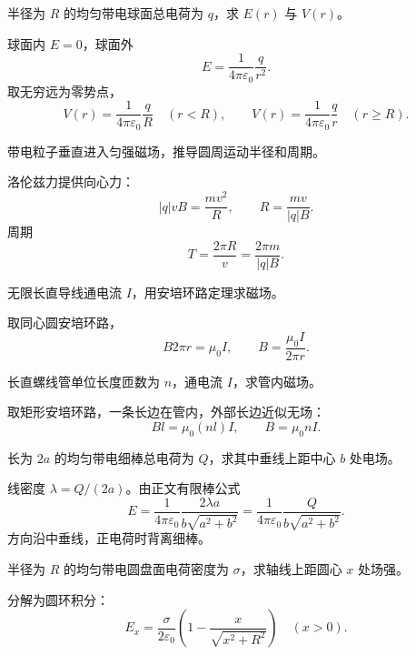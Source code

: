 \begin{exercise}[level=basic]
半径为 $R$ 的均匀带电球面总电荷为 $q$，求 $E(r)$ 与 $V(r)$。
\begin{solution}
球面内 $E=0$，球面外
\[
  E=\frac{1}{4\pi\varepsilon_0}\frac{q}{r^2}.
\]
取无穷远为零势点，
\[
  V(r)=\frac{1}{4\pi\varepsilon_0}\frac{q}{R}\quad(r<R),\qquad
  V(r)=\frac{1}{4\pi\varepsilon_0}\frac{q}{r}\quad(r\ge R).
\]
\end{solution}
\end{exercise}

\begin{exercise}[level=basic]
带电粒子垂直进入匀强磁场，推导圆周运动半径和周期。
\begin{solution}
洛伦兹力提供向心力：
\[
  |q|vB=\frac{mv^2}{R},
  \qquad R=\frac{mv}{|q|B}.
\]
周期
\[
  T=\frac{2\pi R}{v}=\frac{2\pi m}{|q|B}.
\]
\end{solution}
\end{exercise}

\begin{exercise}[level=basic]
无限长直导线通电流 $I$，用安培环路定理求磁场。
\begin{solution}
取同心圆安培环路，
\[
  B2\pi r=\mu_0I,\qquad B=\frac{\mu_0I}{2\pi r}.
\]
\end{solution}
\end{exercise}

\begin{exercise}[level=basic]
长直螺线管单位长度匝数为 $n$，通电流 $I$，求管内磁场。
\begin{solution}
取矩形安培环路，一条长边在管内，外部长边近似无场：
\[
  Bl=\mu_0(nl)I,\qquad B=\mu_0nI.
\]
\end{solution}
\end{exercise}

\begin{exercise}[level=standard]
长为 $2a$ 的均匀带电细棒总电荷为 $Q$，求其中垂线上距中心 $b$ 处电场。
\begin{solution}
线密度 $\lambda=Q/(2a)$。由正文有限棒公式
\[
  E=\frac{1}{4\pi\varepsilon_0}\frac{2\lambda a}{b\sqrt{a^2+b^2}}
  =\frac{1}{4\pi\varepsilon_0}\frac{Q}{b\sqrt{a^2+b^2}}.
\]
方向沿中垂线，正电荷时背离细棒。
\end{solution}
\end{exercise}

\begin{exercise}[level=standard]
半径为 $R$ 的均匀带电圆盘面电荷密度为 $\sigma$，求轴线上距圆心 $x$ 处场强。
\begin{solution}
分解为圆环积分：
\[
  E_x=\frac{\sigma}{2\varepsilon_0}\left(1-\frac{x}{\sqrt{x^2+R^2}}\right)
  \quad (x>0).
\]
\end{solution}
\end{exercise}

